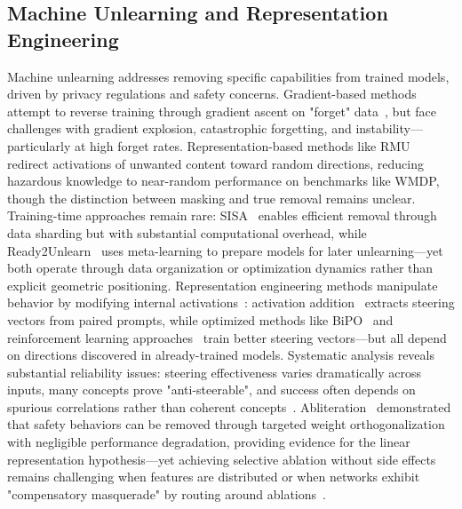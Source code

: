 \subsection{Machine Unlearning and Representation Engineering}

Machine unlearning addresses removing specific capabilities from trained models, driven by privacy regulations and safety concerns. Gradient-based methods attempt to reverse training through gradient ascent on "forget" data~\citep{jang2022knowledgeunlearningmitigatingprivacy,yao-etal-2024-machine,zhang-etal-2024-negative}, but face challenges with gradient explosion, catastrophic forgetting, and instability---particularly at high forget rates. Representation-based methods like RMU~\citep{li2024wmdpbenchmarkmeasuringreducing} redirect activations of unwanted content toward random directions, reducing hazardous knowledge to near-random performance on benchmarks like WMDP, though the distinction between masking and true removal remains unclear. Training-time approaches remain rare: SISA~\citep{bourtoule-etal-2021-machine} enables efficient removal through data sharding but with substantial computational overhead, while Ready2Unlearn~\citep{duan2025ready2unlearnlearningtimeapproachpreparing} uses meta-learning to prepare models for later unlearning---yet both operate through data organization or optimization dynamics rather than explicit geometric positioning. Representation engineering methods manipulate behavior by modifying internal activations~\citep{zou2025representationengineeringtopdownapproach}: activation addition~\citep{TurnerTUDLMM23} extracts steering vectors from paired prompts, while optimized methods like BiPO~\citep{cao2024personalizedsteeringlargelanguage} and reinforcement learning approaches~\citep{sinii2025smallvectorsbigeffects} train better steering vectors---but all depend on directions discovered in already-trained models. Systematic analysis reveals substantial reliability issues: steering effectiveness varies dramatically across inputs, many concepts prove "anti-steerable", and success often depends on spurious correlations rather than coherent concepts~\citep{TanCLPKGK24}. Abliteration~\citep{arditi2024refusallanguagemodelsmediated} demonstrated that safety behaviors can be removed through targeted weight orthogonalization with negligible performance degradation, providing evidence for the linear representation hypothesis---yet achieving selective ablation without side effects remains challenging when features are distributed or when networks exhibit "compensatory masquerade" by routing around ablations~\citep{meyes-etal-2019-ablation}.

